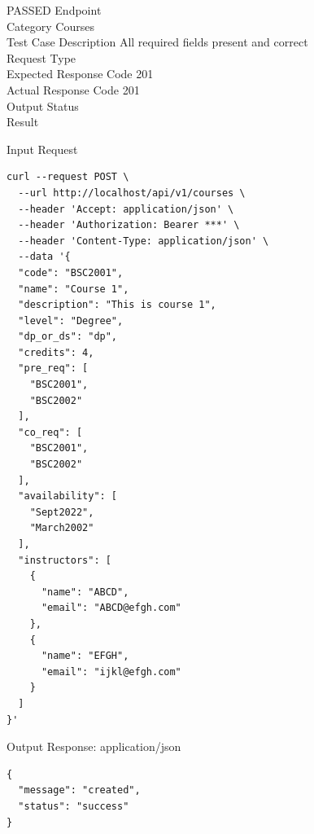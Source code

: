 \begin{testcase}{78}{PASSED}
Endpoint \hfill {}\\
Category \hfill Courses\\
Test Case Description \hfill All required fields present and correct\\

Request Type    \hfill {}\\
Expected Response Code    \hfill 201\\
Actual Response Code    \hfill 201\\

Output Status \hfill {}\\
Result \hfill {}

\begin{ipblock}{Input Request}
\begin{verbatim}
curl --request POST \
  --url http://localhost/api/v1/courses \
  --header 'Accept: application/json' \
  --header 'Authorization: Bearer ***' \
  --header 'Content-Type: application/json' \
  --data '{
  "code": "BSC2001",
  "name": "Course 1",
  "description": "This is course 1",
  "level": "Degree",
  "dp_or_ds": "dp",
  "credits": 4,
  "pre_req": [
    "BSC2001",
    "BSC2002"
  ],
  "co_req": [
    "BSC2001",
    "BSC2002"
  ],
  "availability": [
    "Sept2022",
    "March2002"
  ],
  "instructors": [
    {
      "name": "ABCD",
      "email": "ABCD@efgh.com"
    },
    {
      "name": "EFGH",
      "email": "ijkl@efgh.com"
    }
  ]
}'
\end{verbatim}
\end{ipblock}

\begin{opblock}{Output Response: application/json}
\begin{verbatim}
{
  "message": "created",
  "status": "success"
}
\end{verbatim}
\end{opblock}
\end{testcase}


